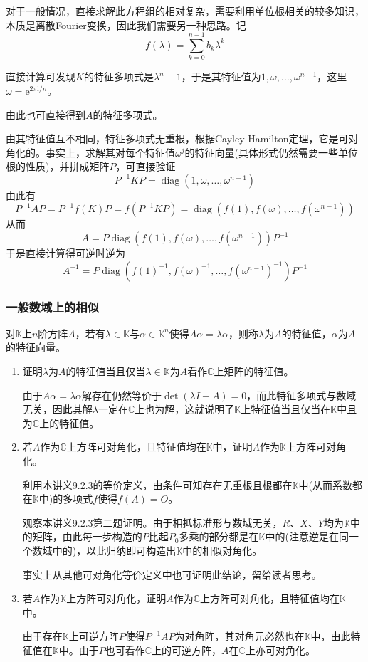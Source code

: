 \documentclass[a4paper,UTF8,fontset=windows]{ctexart}
\DeclareMathOperator{\diag}{diag}
\newcommand*{\note}{\noindent *}
\begin{document}
\begin{enumerate}
    对于一般情况，直接求解此方程组的相对复杂，需要利用单位根相关的较多知识，本质是离散Fourier变换，因此我们需要另一种思路。记
    $$f(\lambda)=\sum_{k=0}^{n-1}b_k\lambda^k$$

    直接计算可发现$K$的特征多项式是$\lambda^n-1$，于是其特征值为$1,\omega,\dots,\omega^{n-1}$，这里$\omega=\mathrm{e}^{2\pi\mathrm{i}/n}$。
    
    \note 由此也可直接得到$A$的特征多项式。

    由其特征值互不相同，特征多项式无重根，根据Cayley-Hamilton定理，它是可对角化的。事实上，求解其对每个特征值$\omega^j$的特征向量(具体形式仍然需要一些单位根的性质)，并拼成矩阵$P$，可直接验证
    $$P^{-1}KP=\diag(1,\omega,\dots,\omega^{n-1})$$
    由此有
    $$P^{-1}AP=P^{-1}f(K)P=f(P^{-1}KP)=\diag(f(1),f(\omega),\dots,f(\omega^{n-1}))$$
    从而
    $$A=P\diag(f(1),f(\omega),\dots,f(\omega^{n-1}))P^{-1}$$
    于是直接计算得可逆时逆为
    $$A^{-1}=P\diag(f(1)^{-1},f(\omega)^{-1},\dots,f(\omega^{n-1})^{-1})P^{-1}$$
\end{enumerate}

\subsubsection{一般数域上的相似}
对$\mathbb{K}$上$n$阶方阵$A$，若有$\lambda\in\mathbb{K}$与$\alpha\in\mathbb{K}^n$使得$A\alpha=\lambda\alpha$，则称$\lambda$为$A$的特征值，$\alpha$为$A$的特征向量。
\begin{enumerate}
    \item 证明$\lambda$为$A$的特征值当且仅当$\lambda\in\mathbb{K}$为$A$看作$\mathbb{C}$上矩阵的特征值。
    
    由于$A\alpha=\lambda\alpha$解存在仍然等价于$\det(\lambda I-A)=0$，而此特征多项式与数域无关，因此其解$\lambda$一定在$\mathbb{C}$上也为解，这就说明了$\mathbb{K}$上特征值当且仅当在$\mathbb{K}$中且为$\mathbb{C}$上的特征值。

    \item 若$A$作为$\mathbb{C}$上方阵可对角化，且特征值均在$\mathbb{K}$中，证明$A$作为$\mathbb{K}$上方阵可对角化。
    
    利用本讲义9.2.3的等价定义，由条件可知存在无重根且根都在$\mathbb{K}$中(从而系数都在$\mathbb{K}$中)的多项式$f$使得$f(A)=O$。
    
    观察本讲义9.2.3第二题证明。由于相抵标准形与数域无关，$R$、$X$、$Y$均为$\mathbb{K}$中的矩阵，由此每一步构造的$P$比起$P_0$多乘的部分都是在$\mathbb{K}$中的(注意逆是在同一个数域中的)，以此归纳即可构造出$\mathbb{K}$中的相似对角化。

    \note 事实上从其他可对角化等价定义中也可证明此结论，留给读者思考。

    \item 若$A$作为$\mathbb{K}$上方阵可对角化，证明$A$作为$\mathbb{C}$上方阵可对角化，且特征值均在$\mathbb{K}$中。
    
    由于存在$\mathbb{K}$上可逆方阵$P$使得$P^{-1}AP$为对角阵，其对角元必然也在$\mathbb{K}$中，由此特征值在$\mathbb{K}$中。由于$P$也可看作$\mathbb{C}$上的可逆方阵，$A$在$\mathbb{C}$上亦可对角化。
\end{enumerate}
\end{document}
